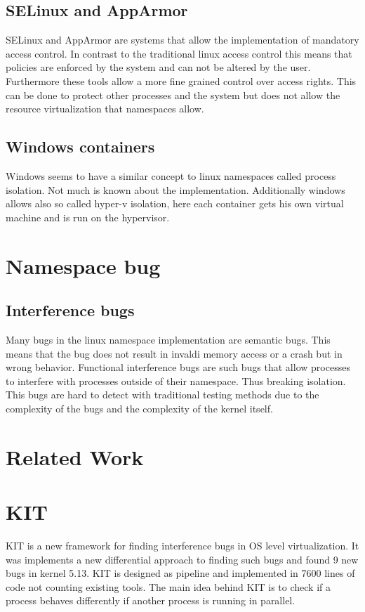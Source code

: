 \documentclass[10pt,twocolumn,a4paper]{article}
\begin{document}
\subsection{SELinux and AppArmor}
SELinux and AppArmor are systems that allow the implementation of mandatory access control. In
contrast to the traditional linux access control this means that policies are enforced by the system
and can not be altered by the user. Furthermore these tools allow a more fine grained control over
access rights. This can be done to protect other processes and the system but does not allow the resource
virtualization that namespaces allow. %
\subsection{Windows containers}%
Windows seems to have a similar concept to linux namespaces called process isolation. Not much is known about the
implementation. Additionally windows allows also so called hyper-v isolation, here each container
gets his own virtual machine and is run on the hypervisor\cite{3}.

\section{Namespace bug}\label{sec:background}
\subsection{Interference bugs}
Many bugs in the linux namespace implementation are semantic bugs. This means that the 
bug does not result in invaldi memory access or a crash but in wrong behavior. Functional interference bugs are
such bugs that allow processes to interfere with processes outside  of their namespace. Thus
breaking isolation. This bugs are hard to detect with traditional testing methods due to the
complexity of the bugs and the complexity of the kernel itself.
\section{Related Work}\label{sec:relwork} 
\section{KIT}
KIT is a new framework for finding interference bugs in OS level virtualization\cite{0}. It was
implements a new differential approach to finding such bugs and found 9 new bugs in kernel 5.13\cite{2}.
KIT is designed as pipeline and implemented in 7600 lines of code not counting existing tools\cite{0}.
The main idea behind KIT is to check if a process behaves differently if another process is running
in parallel.
\end{document}
